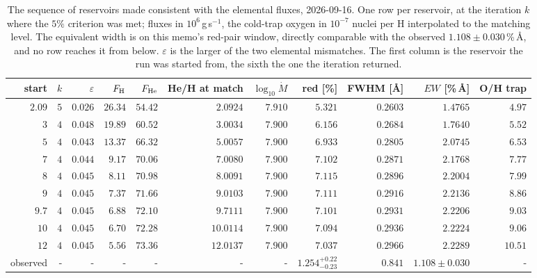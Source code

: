 \documentclass[english,a4paper]{my_memo}
\begin{document}
\begin{table}[htbp]\centering\small
\setlength{\tabcolsep}{3.6pt}
\caption{The sequence of reservoirs made consistent with the elemental
fluxes, 2026-09-16. One row per reservoir, at the iteration $k$ where the
$5\%$ criterion was met; fluxes in $10^{6}$\,g\,s$^{-1}$, the cold-trap
oxygen in $10^{-7}$ nuclei per H interpolated to the matching level. The
equivalent width is on this memo's red-pair window, directly comparable with
the observed $1.108 \pm 0.030$\,\%\,\AA{}, and no row reaches it from below.
$\varepsilon$ is the larger of the two elemental mismatches. The first column
is the reservoir the run was started from, the sixth the one the iteration
returned.}
\label{tab:closureladder}
\begin{tabular}{rrrrrrrrrrr}
\toprule
start & $k$ & $\varepsilon$ & $F_{\rm H}$ & $F_{\rm He}$ &
He/H at match & $\log_{10}\dot M$ & red [\%] & FWHM [\AA] & $EW$ [\%\,\AA] &
O/H trap \\
\midrule
$2.09$ & $5$ & $0.026$ & $26.34$ & $54.42$ & $2.0924$ & $7.910$ & $5.321$ & $0.2603$ & $1.4765$ & $4.97$ \\
$3$ & $4$ & $0.048$ & $19.89$ & $60.52$ & $3.0034$ & $7.900$ & $6.156$ & $0.2684$ & $1.7640$ & $5.52$ \\
$5$ & $4$ & $0.043$ & $13.37$ & $66.32$ & $5.0057$ & $7.900$ & $6.933$ & $0.2805$ & $2.0745$ & $6.53$ \\
$7$ & $4$ & $0.044$ & $9.17$ & $70.06$ & $7.0080$ & $7.900$ & $7.102$ & $0.2871$ & $2.1768$ & $7.77$ \\
$8$ & $4$ & $0.045$ & $8.11$ & $70.98$ & $8.0091$ & $7.900$ & $7.115$ & $0.2896$ & $2.2004$ & $7.99$ \\
$9$ & $4$ & $0.045$ & $7.37$ & $71.66$ & $9.0103$ & $7.900$ & $7.111$ & $0.2916$ & $2.2136$ & $8.86$ \\
$9.7$ & $4$ & $0.045$ & $6.88$ & $72.10$ & $9.7111$ & $7.900$ & $7.101$ & $0.2931$ & $2.2206$ & $9.03$ \\
$10$ & $4$ & $0.045$ & $6.70$ & $72.28$ & $10.0114$ & $7.900$ & $7.094$ & $0.2936$ & $2.2224$ & $9.06$ \\
$12$ & $4$ & $0.045$ & $5.56$ & $73.36$ & $12.0137$ & $7.900$ & $7.037$ & $0.2966$ & $2.2289$ & $10.51$ \\
\midrule
observed & - & - & - & - & - & - & $1.254^{+0.22}_{-0.23}$ &
$0.841$ & $1.108 \pm 0.030$ & - \\
\bottomrule
\end{tabular}
\end{table}
\end{document}
